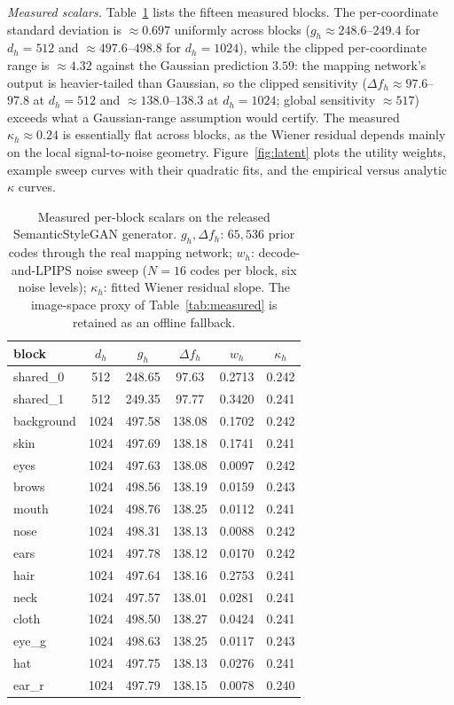 \documentclass[10pt,twocolumn,letterpaper]{article}
\theoremstyle{plain}
\theoremstyle{definition}
\begin{document}
\emph{Measured scalars.} Table~\ref{tab:latent_scalars} lists the fifteen
measured blocks. The per-coordinate standard deviation is $\approx0.697$
uniformly across blocks ($g_h\approx248.6$--$249.4$ for $d_h=512$ and
$\approx497.6$--$498.8$ for $d_h=1024$), while the clipped per-coordinate
range is $\approx4.32$ against the Gaussian prediction $3.59$: the mapping
network's output is heavier-tailed than Gaussian, so the clipped sensitivity
($\Delta f_h\approx97.6$--$97.8$ at $d_h=512$ and $\approx138.0$--$138.3$ at
$d_h=1024$; global sensitivity $\approx517$) exceeds what a Gaussian-range
assumption would certify. The measured $\kappa_h\approx0.24$ is essentially
flat across blocks, as the Wiener residual depends mainly on the local
signal-to-noise geometry. Figure~\ref{fig:latent} plots the utility
weights, example sweep curves with their quadratic fits, and the empirical
versus analytic $\kappa$ curves.

\begin{table}[t]
\centering\footnotesize
\setlength{\tabcolsep}{3.5pt}
\caption{Measured per-block scalars on the released SemanticStyleGAN
generator. $g_h,\Delta f_h$: $65{,}536$ prior codes through the real mapping
network; $w_h$: decode-and-LPIPS noise sweep ($N{=}16$ codes per block, six
noise levels); $\kappa_h$: fitted Wiener residual slope. The image-space
proxy of Table~\ref{tab:measured} is retained as an offline fallback.}
\label{tab:latent_scalars}
\begin{tabular}{lccccc}
\toprule
block & $d_h$ & $g_h$ & $\Delta f_h$ & $w_h$ & $\kappa_h$ \\
\midrule
shared\_0  & 512  & 248.65 & 97.63  & 0.2713 & 0.242 \\
shared\_1  & 512  & 249.35 & 97.77  & 0.3420 & 0.241 \\
background & 1024 & 497.58 & 138.08 & 0.1702 & 0.242 \\
skin       & 1024 & 497.69 & 138.18 & 0.1741 & 0.241 \\
eyes       & 1024 & 497.63 & 138.08 & 0.0097 & 0.242 \\
brows      & 1024 & 498.56 & 138.19 & 0.0159 & 0.243 \\
mouth      & 1024 & 498.76 & 138.25 & 0.0112 & 0.241 \\
nose       & 1024 & 498.31 & 138.13 & 0.0088 & 0.242 \\
ears       & 1024 & 497.78 & 138.12 & 0.0170 & 0.242 \\
hair       & 1024 & 497.64 & 138.16 & 0.2753 & 0.241 \\
neck       & 1024 & 497.57 & 138.01 & 0.0281 & 0.241 \\
cloth      & 1024 & 498.50 & 138.27 & 0.0424 & 0.241 \\
eye\_g     & 1024 & 498.63 & 138.25 & 0.0117 & 0.243 \\
hat        & 1024 & 497.75 & 138.13 & 0.0276 & 0.241 \\
ear\_r     & 1024 & 497.79 & 138.15 & 0.0078 & 0.240 \\
\bottomrule
\end{tabular}
\end{table}
\end{document}
